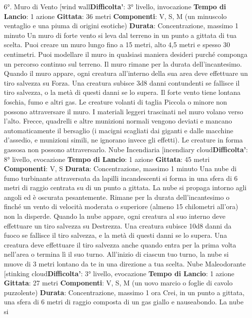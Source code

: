 \begin{multicols}{2}
6°.
Muro di Vento
[wind wall\textbf{Difficolta'}:
3° livello, invocazione
\textbf{Tempo di Lancio}: 1 azione
\textbf{Gittata}: 36 metri
\textbf{Componenti}: V, S, M (un minuscolo ventaglio e una
piuma di origini esotiche)
\textbf{Durata}: Concentrazione, massimo 1 minuto
Un muro di forte vento si leva dal terreno in un punto a
gittata di tua scelta. Puoi creare un muro lungo fino a 15
metri, alto 4,5 metri e spesso 30 centimetri. Puoi
modellare il muro in qualsiasi maniera desideri purché
componga un percorso continuo sul terreno. Il muro
rimane per la durata dell’incantesimo.
Quando il muro appare, ogni creatura all’interno della
sua area deve effettuare un tiro salvezza su Forza. Una
creatura subisce 3d8 danni contundenti se fallisce il tiro
salvezza, o la metà di questi danni se lo supera.
Il forte vento tiene lontana foschia, fumo e altri gas. Le
creature volanti di taglia Piccola o minore non possono
attraversare il muro. I materiali leggeri trascinati nel
muro volano verso l’alto. Frecce, quadrelli e altre
munizioni normali vengono deviati e mancano
automaticamente il bersaglio (i macigni scagliati dai
giganti e dalle macchine d’assedio, e munizioni simili,
ne ignorano invece gli effetti). Le creature in forma
gassosa non possono attraversarlo.
Nube Incendiaria
[incendiary cloud\textbf{Difficolta'}:
8° livello, evocazione
\textbf{Tempo di Lancio}: 1 azione
\textbf{Gittata}: 45 metri
\textbf{Componenti}: V, S
\textbf{Durata}: Concentrazione, massimo 1 minuto
Una nube di fumo turbinante attraversata da lapilli
incandescenti si forma in una sfera di 6 metri di raggio
centrata su di un punto a gittata. La nube si propaga
intorno agli angoli ed è oscurata pesantemente. Rimane
per la durata dell’incantesimo o finché un vento di
velocità moderata o superiore (almeno 15 chilometri
all’ora) non la disperde.
Quando la nube appare, ogni creatura al suo interno
deve effettuare un tiro salvezza su Destrezza. Una
creatura subisce 10d8 danni da fuoco se fallisce il tiro
salvezza, e la metà di questi danni se lo supera. Una
creatura deve effettuare il tiro salvezza anche quando
entra per la prima volta nell’area o termina lì il suo
turno.
All’inizio di ciascun tuo turno, la nube si muove di 3
metri lontano da te in una direzione a tua scelta.
Nube Maleodorante
[stinking cloud\textbf{Difficolta'}:
3° livello, evocazione
\textbf{Tempo di Lancio}: 1 azione
\textbf{Gittata}: 27 metri
\textbf{Componenti}: V, S, M (un uovo marcio o foglie di
cavolo puzzolente)
\textbf{Durata}: Concentrazione, massimo 1 ora
Crei, in un punto a gittata, una sfera di 6 metri di raggio
composta di un gas giallo e nauseabondo. La nube si

\end{multicols}
